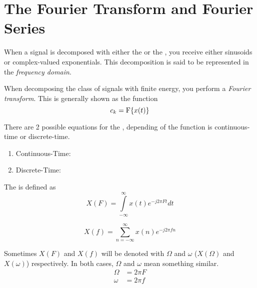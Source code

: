 \section{The Fourier Transform and Fourier Series}\label{sec:FourierTransformSeries}
When a signal is decomposed with either the  or the , you receive either sinusoids or complex-valued exponentials.
This decomposition is said to be represented in the \emph{frequency domain}.

\begin{definition}\label{def:FourierTransform}
  When decomposing the class of signals with finite energy, you perform a \emph{Fourier transform}.
  This is generally shown as the function
  \begin{equation*}
    c_{k} = \operatorname{F} \lbrace x(t) \rbrace
  \end{equation*}

  There are 2 possible equations for the , depending of the function is continuous-time or discrete-time.
  \begin{enumerate}[noitemsep]
  \item Continuous-Time: 
  \item Discrete-Time: 
  \end{enumerate}
  
  The  is defined as
  \begin{equation}\label{eq:FourierTransform-Continuous-Frequency}
    X(F) = \int\limits_{-\infty}^{\infty} x(t) e^{-j 2 \pi F t} dt
  \end{equation}

  \begin{equation}\label{eq:FourierTransform-Discrete-Frequency}
    X(f) = \sum\limits_{n=-\infty}^{\infty} x(n) e^{-j 2 \pi f n}
  \end{equation}

  \begin{remark}
    Sometimes $X(F)$ and $X(f)$ will be denoted with $\Omega$ and $\omega$ ($X(\Omega)$ and $X(\omega)$) respectively.
    In both cases, $\Omega$ and $\omega$ mean something similar.
    \begin{align*}
      \Omega &= 2 \pi F \\
      \omega &= 2 \pi f
    \end{align*}


\end{remark}
\end{definition}
